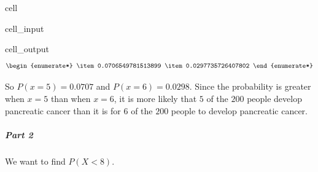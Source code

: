 \documentclass[letterpaper,10pt,english]{jupyterBook}
\begin{document}
\begin{sphinxuseclass}{cell}\begin{sphinxVerbatimInput}

\begin{sphinxuseclass}{cell_input}
\begin{sphinxVerbatim}[commandchars=\\\{\}]
\end{sphinxVerbatim}

\end{sphinxuseclass}\end{sphinxVerbatimInput}
\begin{sphinxVerbatimOutput}

\begin{sphinxuseclass}{cell_output}\begin{equation*}
\begin{split}\begin{enumerate*}
\item 0.0706549781513899
\item 0.0297735726407802
\end{enumerate*}\end{split}
\end{equation*}
\end{sphinxuseclass}\end{sphinxVerbatimOutput}

\end{sphinxuseclass}
\sphinxAtStartPar
So \(P(x = 5) = 0.0707\) and \(P(x = 6) = 0.0298\). Since the probability is greater when \(x = 5\) than when \(x = 6\), it is more likely that \(5\) of the \(200\) people develop pancreatic cancer than it is for \(6\) of the \(200\) people to develop pancreatic cancer.


\subparagraph{Part 2}
\label{\detokenize{Ch3 Probability/3.6 The Binomial Distribution:id9}}
\sphinxAtStartPar
We want to find \(P(X < 8)\).
\end{document}
